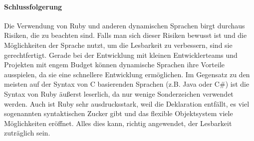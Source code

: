 %
%
%





\paragraph{Schlussfolgerung}
Die Verwendung von Ruby und anderen dynamischen Sprachen birgt durchaus Risiken, die zu beachten sind. Falls man sich dieser Risiken bewusst ist und die Möglichkeiten der Sprache nutzt, um die Lesbarkeit zu verbessern, sind sie gerechtfertigt. Gerade bei der Entwicklung mit kleinen Entwicklerteams und Projekten mit engem Budget können dynamische Sprachen ihre Vorteile ausspielen, da sie eine schnellere Entwicklung ermöglichen. Im Gegensatz zu den meisten auf der Syntax von C basierenden Sprachen (z.B. Java oder C\#) ist die Syntax von Ruby äußerst leserlich, da nur wenige Sonderzeichen verwendet werden. Auch ist Ruby sehr ausdrucksstark, weil die Deklaration entfällt, es viel sogenannten syntaktischen Zucker gibt und das flexible Objektsystem viele Möglichkeiten eröffnet. Alles dies kann, richtig angewendet, der Lesbarkeit zuträglich sein.


